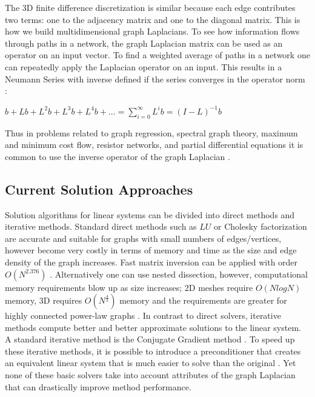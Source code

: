 \documentclass{article}
\begin{document}
The 3D finite difference discretization is similar because each edge contributes two terms: one to the adjacency matrix and one to the diagonal matrix. This is how we build multidimensional graph Laplacians.
To see how information flows through paths in a network, the graph Laplacian matrix can be used as an operator on an input vector. To find a weighted average of paths in a network one can repeatedly apply the Laplacian operator on an input. This results in a Neumann Series with inverse defined if the series converges in the operator norm \cite{Neumann:1877,Kantorovich:1982}:\\
\begin{center}
$b + Lb + L^{2}b + L^{3}b + L^{4}b + ... = \sum_{i = 0}^{\infty} L^{i}b = (I-L)^{-1}b$\\
\end{center}
Thus in problems related to graph regression, spectral graph theory, maximum and minimum cost flow, resistor networks, and partial differential equations it is common to use the inverse operator of the graph Laplacian \cite{Spielman:2010}.

\subsection{Current Solution Approaches}
Solution algorithms for linear systems can be divided into direct methods and iterative methods. Standard direct methods such as $LU$ or Cholesky factorization are accurate and suitable for graphs with small numbers of edges/vertices, however become very costly in terms of memory and time as the size and edge density of the graph increases. Fast matrix inversion can be applied with order $O(N^{2.376})$ \cite{Spielman:2010}. Alternatively one can use nested dissection, however, computational memory requirements blow up as size increases; 2D meshes require $O(N log N)$ memory, 3D requires $O(N^{\frac{4}{3}})$ memory and the requirements are greater for highly connected power-law graphs \cite{Khaira:1992}. In contrast to direct solvers, iterative methods compute better and better approximate solutions to the linear system. A standard iterative method is the Conjugate Gradient method \cite{Hestenes:1952}. To speed up these iterative methods, it is possible to introduce a preconditioner that creates an equivalent linear system that is much easier to solve than the original \cite{Saad:2003}. Yet none of these basic solvers take into account attributes of the graph Laplacian that can drastically improve method performance.
\end{document}
